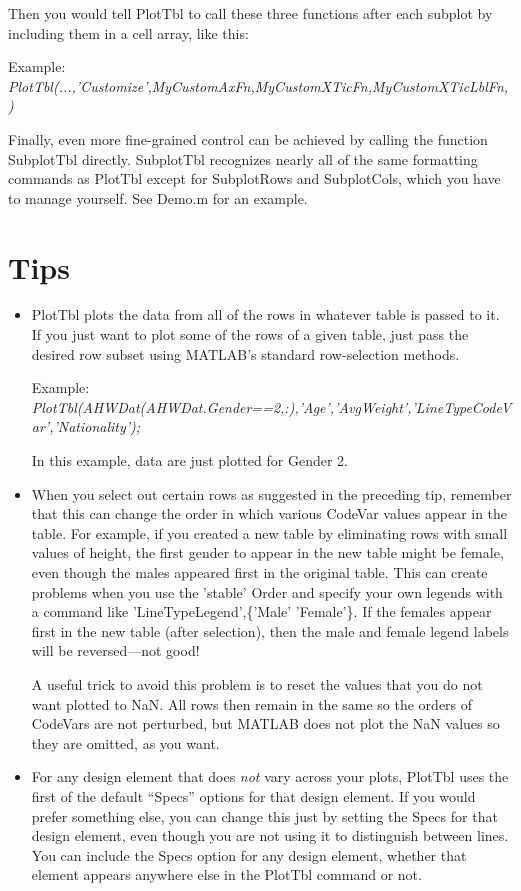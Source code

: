\documentclass{article}
\newcommand{\example}[1]{Example: {\it #1}}
\begin{document}
Then you would tell PlotTbl to call these three functions after each subplot by including them
in a cell array, like this:

\example{PlotTbl(...,'Customize',{MyCustomAxFn,MyCustomXTicFn,MyCustomXTicLblFn,})}

Finally, even more fine-grained control can be achieved by calling the function SubplotTbl directly.
SubplotTbl recognizes nearly all of the same formatting commands as PlotTbl
except for SubplotRows and SubplotCols, which you have to manage yourself.
See Demo.m for an example.

\section{Tips}

\begin{itemize}

\item PlotTbl plots the data from all of the rows in whatever table is passed to it.
If you just want to plot some of the rows of a given table, just pass
the desired row subset using MATLAB's standard row-selection methods.

\example{PlotTbl(AHWDat(AHWDat.Gender==2,:),'Age','AvgWeight','LineTypeCodeVar','Nationality');} 

In this example, data are just plotted for Gender 2.

\item When you select out certain rows as suggested in the preceding tip, remember that
this can change the order in which various CodeVar values appear in the table.
For example, if you created a new table by eliminating rows with small values of height, the first gender
to appear in the new table might be female, even though the males appeared first in the original table.
This can create problems when you use the 'stable' Order and specify your own legends
with a command like 'LineTypeLegend',\{'Male' 'Female'\}.
If the females appear first in the new table (after selection), then the male and
female legend labels will be reversed---not good!

A useful trick to avoid this problem is to reset the values that you do not want plotted to NaN.
All rows then remain in the same so the orders of CodeVars are not perturbed,
but MATLAB does not plot the NaN values so they are omitted, as you want.



\item For any design element that does \emph{not} vary across your plots,
PlotTbl uses the first of the default ``Specs'' options for that design element.
If you would prefer something else, you can change this just by setting the Specs
for that design element, even though you are not using it to distinguish between lines.
You can include the Specs option for any design element, whether that element appears
anywhere else in the PlotTbl command or not.


\end{itemize}
\end{document}
